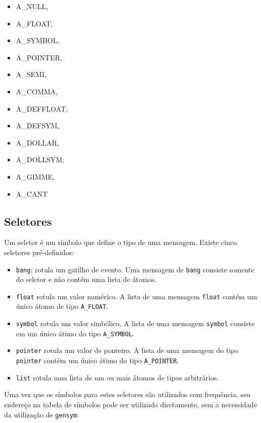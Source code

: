 \begin{itemize}
\item A\_NULL,
\item A\_FLOAT,
\item A\_SYMBOL,
\item A\_POINTER,
\item A\_SEMI,
\item A\_COMMA,
\item A\_DEFFLOAT,
\item A\_DEFSYM,
\item A\_DOLLAR, 
\item A\_DOLLSYM,
\item A\_GIMME,
\item A\_CANT
\end{itemize}


\subsection{Seletores}

Um seletor é um símbolo que define o tipo de uma mensagem. Existe cinco
seletores pré-definidos:

\begin{itemize}
  \item \texttt{bang}: rotula um gatilho de evento. Uma mensagem de
    \texttt{bang} consiste somente do seletor e não contém uma lista de átomos.
  \item \texttt{float} rotula um valor numérico. A lista de uma mensagem
    \texttt{float} contém um único átomo de tipo \texttt{A\_FLOAT}.
  \item \texttt{symbol} rotula um valor simbólico. A lista de uma mensagem
    \texttt{symbol} consiste em um único átimo do tipo \texttt{A\_SYMBOL}.
  \item \texttt{pointer} rotula um valor de ponteiro. A lista de uma mensagem do
    tipo \texttt{pointer} contém um único átimo do tipo \texttt{A\_POINTER}.
  \item \texttt{list} rotula uma lista de um ou mais átomos de tipos arbitrários.
\end{itemize}

Uma vez que os símbolos para estes seletores são utilizados com frequência,
seu endereço na tabela de símbolos pode ser utilizado diretamente, sem a
necessidade da utilização de \texttt{gensym}:

